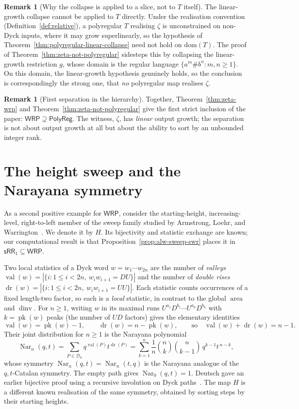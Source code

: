 \documentclass[11pt]{article}
\theoremstyle{definition}
\newtheorem{remark}[theorem]{Remark}
\newcommand{\D}{\mathcal D}
\newcommand{\WRP}{\mathsf{WRP}}
\newcommand{\SWR}{\mathsf{sRR}_1}
\newcommand{\area}{\operatorname{area}}
\newcommand{\dinv}{\operatorname{dinv}}
\newcommand{\val}{\operatorname{val}}
\newcommand{\dr}{\operatorname{dr}}
\newcommand{\pk}{\operatorname{pk}}
\newcommand{\Nar}{\operatorname{Nar}}
\newcommand{\polyreg}{\mathsf{PolyReg}}
\begin{document}
\begin{remark}[Why the collapse is applied to a slice, not to $T$ itself]
The linear-growth collapse cannot be applied to $T$ directly.  Under the
realisation convention (Definition~\ref{def:relative}), a polyregular $T$
realising $\zeta$ is unconstrained on non-Dyck inputs, where it may grow
superlinearly, so the hypothesis of
Theorem~\ref{thm:polyregular-linear-collapse} need not hold on
$\mathrm{dom}(T)$.  The proof of Theorem~\ref{thm:zeta-not-polyregular}
sidesteps this by collapsing the linear-growth restriction $g$, whose
domain is the regular language $\{a^m\#b^n:m,n\ge 1\}$.  On this domain, the
linear-growth hypothesis genuinely holds, so the conclusion is correspondingly
the strong one, that \emph{no} polyregular map realises $\zeta$.
\end{remark}

\begin{remark}[First separation in the hierarchy]
Together, Theorem~\ref{thm:zeta-wrp} and
Theorem~\ref{thm:zeta-not-polyregular} give the first strict inclusion of the
paper: $\WRP\supsetneq\polyreg$.  The witness, $\zeta$, has \emph{linear}
output growth; the separation is not about output growth at all but about the
ability to sort by an unbounded integer rank.
\end{remark}

\section{The height sweep and the Narayana symmetry}
\label{sec:narayana-sweep}

As a second positive example for $\WRP$, consider the starting-height,
increasing-level, right-to-left member of the sweep family studied by
Armstrong, Loehr, and Warrington~\cite{ArmstrongLoehrWarrington2015,
ArmstrongLoehrWarrington2016}.  We denote it by $H$.  Its bijectivity and
statistic exchange are known; our computational result is that
Proposition~\ref{prop:alw-sweep-swr} places it in $\SWR\subseteq\WRP$.

Two local statistics of a Dyck word $w=w_1\cdots w_{2n}$ are the number of
\emph{valleys}
$\val(w)=|\{i:1\le i<2n,\ w_iw_{i+1}=DU\}|$ and the number of
\emph{double rises}
$\dr(w)=|\{i:1\le i<2n,\ w_iw_{i+1}=UU\}|$.  Each statistic counts occurrences
of a fixed length-two factor, so each is a \emph{local} statistic, in contrast to the
global $\area$ and $\dinv$.  For $n\ge 1$, writing $w$ in its maximal runs
$U^{a_1}D^{b_1}\cdots U^{a_k}D^{b_k}$ with $k=\pk(w)$ peaks (the number of $UD$
factors) gives the elementary identities
\[
   \val(w)=\pk(w)-1,\qquad \dr(w)=n-\pk(w),\qquad
   \text{so}\quad \val(w)+\dr(w)=n-1.
\]
Their joint distribution for $n\ge 1$ is the Narayana polynomial
\[
   \Nar_n(q,t)=\sum_{P\in\D_n}q^{\val(P)}t^{\dr(P)}
   =\sum_{k=1}^{n}\frac1n\binom nk\binom n{k-1}\,q^{k-1}t^{\,n-k},
\]
whose symmetry $\Nar_n(q,t)=\Nar_n(t,q)$ is the Narayana analogue of the
$q,t$-Catalan symmetry.  The empty path gives $\Nar_0(q,t)=1$.  Deutsch gave
an earlier bijective proof using a
recursive involution on Dyck paths~\cite{Deutsch1999}.  The map $H$ is a
different known realisation of the same symmetry, obtained by sorting steps by
their starting heights.
\end{document}
